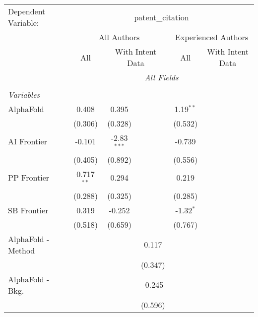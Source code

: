 \begingroup
\centering
\begin{tabular}{lcccccc}
   \tabularnewline \midrule \midrule
   Dependent Variable: & \multicolumn{6}{c}{patent\_citation}\\
 & \multicolumn{3}{c}{All Authors} & \multicolumn{3}{c}{Experienced Authors} \\
\cmidrule(lr){2-4} \cmidrule(lr){5-7}
 & \multicolumn{1}{c}{All} & \multicolumn{2}{c}{With Intent Data} & \multicolumn{1}{c}{All} & \multicolumn{2}{c}{With Intent Data} \\
\cmidrule(lr){2-2} \cmidrule(lr){3-4} \cmidrule(lr){5-5} \cmidrule(lr){6-7}
 & \multicolumn{6}{c}{\textit{All Fields}} \\ \\
   \emph{Variables}\\
   AlphaFold                     & 0.408        & 0.395         &               & 1.19$^{**}$ &        &   \\   
                                 & (0.306)      & (0.328)       &               & (0.532)     &        &   \\   
   AI Frontier                   & -0.101       & -2.83$^{***}$ &               & -0.739      &        &   \\   
                                 & (0.405)      & (0.892)       &               & (0.556)     &        &   \\   
   PP Frontier                   & 0.717$^{**}$ & 0.294         &               & 0.219       &        &   \\   
                                 & (0.288)      & (0.325)       &               & (0.285)     &        &   \\   
   SB Frontier                   & 0.319        & -0.252        &               & -1.32$^{*}$ &        &   \\   
                                 & (0.518)      & (0.659)       &               & (0.767)     &        &   \\   
   AlphaFold - Method            &              &               & 0.117         &             &        &   \\   
                                 &              &               & (0.347)       &             &        &   \\   
   AlphaFold - Bkg.              &              &               & -0.245        &             &        &   \\   
                                 &              &               & (0.596)       &             &        &   \\   

\end{tabular}
